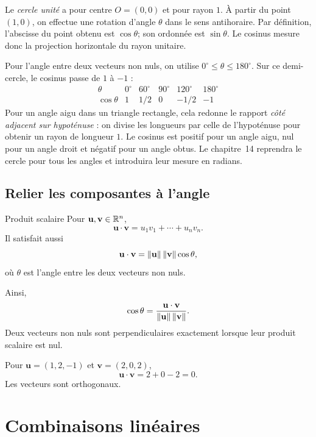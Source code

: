 Le \emph{cercle unité} a pour centre $O=(0,0)$ et pour rayon $1$. À partir du point $(1,0)$, on effectue une rotation d'angle $\theta$ dans le sens antihoraire. Par définition, l'abscisse du point obtenu est $\cos\theta$; son ordonnée est $\sin\theta$. Le cosinus mesure donc la projection horizontale du rayon unitaire.

Pour l'angle entre deux vecteurs non nuls, on utilise $0^\circ\le\theta\le180^\circ$. Sur ce demi-cercle, le cosinus passe de $1$ à $-1$ :
\[
\begin{array}{c|ccccc}
\theta & 0^\circ & 60^\circ & 90^\circ & 120^\circ & 180^\circ\\ \hline
\cos\theta & 1 & 1/2 & 0 & -1/2 & -1
\end{array}
\]
Pour un angle aigu dans un triangle rectangle, cela redonne le rapport \emph{côté adjacent sur hypoténuse} : on divise les longueurs par celle de l'hypoténuse pour obtenir un rayon de longueur $1$. Le cosinus est positif pour un angle aigu, nul pour un angle droit et négatif pour un angle obtus. Le chapitre~14 reprendra le cercle pour tous les angles et introduira leur mesure en radians.

\subsection{Relier les composantes à l'angle}

\begin{definition}{Produit scalaire}{}
Pour $\mathbf u,\mathbf v\in\mathbb{R}^n$,
\[
\mathbf u\cdot\mathbf v=u_1v_1+\cdots+u_nv_n.
\]
Il satisfait aussi
\[
\mathbf u\cdot\mathbf v=\left\lVert \mathbf u\right\rVert\left\lVert \mathbf v\right\rVert\cos\theta,
\]
où $\theta$ est l'angle entre les deux vecteurs non nuls.
\end{definition}

Ainsi,
\[
\cos\theta=\frac{\mathbf u\cdot\mathbf v}{\left\lVert \mathbf u\right\rVert\left\lVert \mathbf v\right\rVert}.
\]
Deux vecteurs non nuls sont perpendiculaires exactement lorsque leur produit scalaire est nul.

\begin{examplebox}
Pour $\mathbf u=(1,2,-1)$ et $\mathbf v=(2,0,2)$,
\[
\mathbf u\cdot\mathbf v=2+0-2=0.
\]
Les vecteurs sont orthogonaux.
\end{examplebox}

\section{Combinaisons linéaires}
\label{manual:section:09.05}

